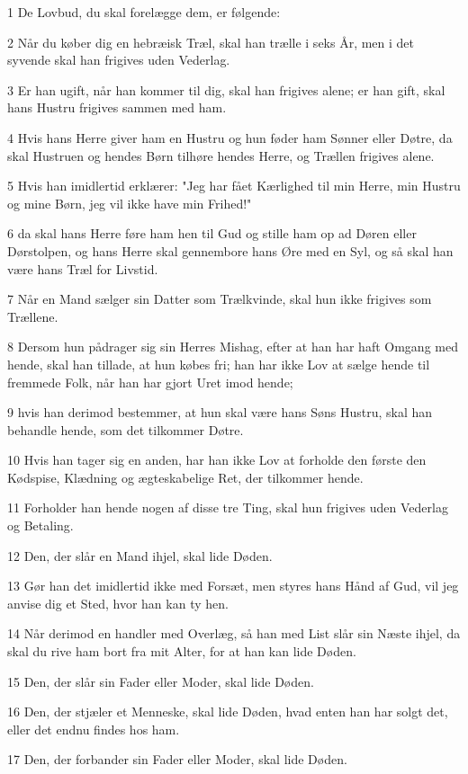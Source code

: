 \par 1 De Lovbud, du skal forelægge dem, er følgende:
\par 2 Når du køber dig en hebræisk Træl, skal han trælle i seks År, men i det syvende skal han frigives uden Vederlag.
\par 3 Er han ugift, når han kommer til dig, skal han frigives alene; er han gift, skal hans Hustru frigives sammen med ham.
\par 4 Hvis hans Herre giver ham en Hustru og hun føder ham Sønner eller Døtre, da skal Hustruen og hendes Børn tilhøre hendes Herre, og Trællen frigives alene.
\par 5 Hvis han imidlertid erklærer: "Jeg har fået Kærlighed til min Herre, min Hustru og mine Børn, jeg vil ikke have min Frihed!"
\par 6 da skal hans Herre føre ham hen til Gud og stille ham op ad Døren eller Dørstolpen, og hans Herre skal gennembore hans Øre med en Syl, og så skal han være hans Træl for Livstid.
\par 7 Når en Mand sælger sin Datter som Trælkvinde, skal hun ikke frigives som Trællene.
\par 8 Dersom hun pådrager sig sin Herres Mishag, efter at han har haft Omgang med hende, skal han tillade, at hun købes fri; han har ikke Lov at sælge hende til fremmede Folk, når han har gjort Uret imod hende;
\par 9 hvis han derimod bestemmer, at hun skal være hans Søns Hustru, skal han behandle hende, som det tilkommer Døtre.
\par 10 Hvis han tager sig en anden, har han ikke Lov at forholde den første den Kødspise, Klædning og ægteskabelige Ret, der tilkommer hende.
\par 11 Forholder han hende nogen af disse tre Ting, skal hun frigives uden Vederlag og Betaling.
\par 12 Den, der slår en Mand ihjel, skal lide Døden.
\par 13 Gør han det imidlertid ikke med Forsæt, men styres hans Hånd af Gud, vil jeg anvise dig et Sted, hvor han kan ty hen.
\par 14 Når derimod en handler med Overlæg, så han med List slår sin Næste ihjel, da skal du rive ham bort fra mit Alter, for at han kan lide Døden.
\par 15 Den, der slår sin Fader eller Moder, skal lide Døden.
\par 16 Den, der stjæler et Menneske, skal lide Døden, hvad enten han har solgt det, eller det endnu findes hos ham.
\par 17 Den, der forbander sin Fader eller Moder, skal lide Døden.

